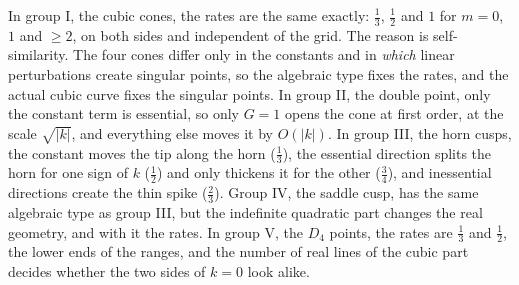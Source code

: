 \documentclass[12pt, a4paper, oneside]{book}
\theoremstyle{plain}
\theoremstyle{definition}
\theoremstyle{remark}
\theoremstyle{definition}
\begin{document}
In group I, the cubic cones, the rates are the same exactly: $\tfrac13$, $\tfrac12$ and $1$ for $m=0$, $1$ and $\ge2$, on both sides and independent of the grid. The reason is self-similarity. The four cones differ only in the constants and in \emph{which} linear perturbations create singular points, so the algebraic type fixes the rates, and the actual cubic curve fixes the singular points. In group II, the double point, only the constant term is essential, so only $G=1$ opens the cone at first order, at the scale $\sqrt{|k|}$, and everything else moves it by $O(|k|)$. In group III, the horn cusps, the constant moves the tip along the horn ($\tfrac13$), the essential direction splits the horn for one sign of $k$ ($\tfrac12$) and only thickens it for the other ($\tfrac34$), and inessential directions create the thin spike ($\tfrac23$). Group IV, the saddle cusp, has the same algebraic type as group III, but the indefinite quadratic part changes the real geometry, and with it the rates. In group V, the $D_4$ points, the rates are $\tfrac13$ and $\tfrac12$, the lower ends of the ranges, and the number of real lines of the cubic part decides whether the two sides of $k=0$ look alike.
\end{document}
